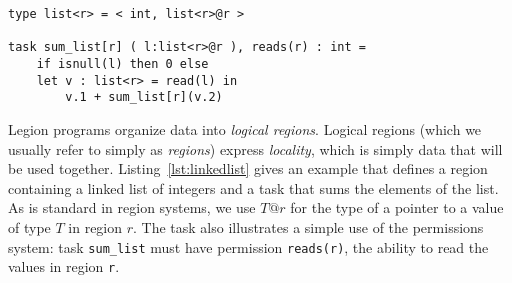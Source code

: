 \begin{lstlisting}[label={lst:linkedlist},caption={Linked List Example}]
type list<r> = < int, list<r>@r >

task sum_list[r] ( l:list<r>@r ), reads(r) : int =
    if isnull(l) then 0 else
    let v : list<r> = read(l) in
        v.1 + sum_list[r](v.2)
\end{lstlisting}

Legion programs organize data into {\em logical regions}.  Logical
regions (which we usually refer to simply as {\em regions}) express
{\em locality}, which is simply data that will be used together.
Listing~\ref{lst:linkedlist} gives an example that defines a region
containing a linked list of integers and a task that sums the elements
of the list.  As is standard in region systems, we use $T @ r$ for the
type of a pointer to a value of type $T$ in region $r$.  The task also
illustrates a simple use of the permissions system:
task {\tt sum\_list} must have permission {\tt reads(r)}, the ability
to read the values in region {\tt r}.

